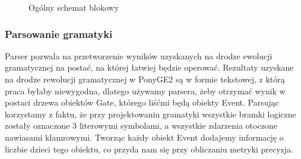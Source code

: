 \begin{figure}[!ht]
	\caption{\label{fig:flow_chart}Ogólny schemat blokowy}
\end{figure}

\subsubsection{Parsowanie gramatyki}
Parser pozwala na przetworzenie wyników uzyskanych na drodze ewolucji gramatycznej na postać, na której łatwiej będzie operować. Rezultaty uzyskane na drodze rewolucji gramatycznej w PonyGE2 są w formie tekstowej, z którą praca byłaby niewygodna, dlatego używamy parsera, żeby otrzymać wynik w postaci drzewa obiektów Gate, którego liśćmi będą obiekty Event.
Parsując korzystamy z faktu, że przy projektowaniu gramatyki wszystkie bramki logiczne zostały oznaczone 3 literowymi symbolami, a wszystkie zdarzenia otoczone nawiasami klamrowymi. Tworząc każdy obiekt Event dodajemy informację o liczbie dzieci tego obiektu, co przyda nam się przy obliczaniu metryki precyzja.

